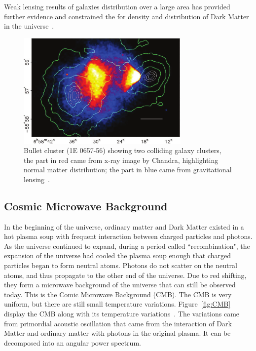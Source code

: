     Weak lensing results of galaxies distribution over a large area has provided further evidence and constrained the for density and distribution of Dark Matter in the universe~\cite{wittman2000detection}.


\begin{figure}[!htb]
    \begin{center}
        \includegraphics[width=0.75\textwidth]{figures/chapter_DM/BulletCluster}
        \caption{
			Bullet cluster (1E 0657-56) showing two colliding galaxy clusters, the part in red came from x-ray image by Chandra, highlighting normal matter distribution; the part in blue came from gravitational lensing~\cite{BulletCluster}.
        }
        \label{fig:BulletCluster_figure}
    \end{center}
\end{figure}

\subsection{Cosmic Microwave Background}
\label{sec:CMB}
In the beginning of the universe, ordinary matter and Dark Matter existed in a hot plasma soup with frequent interaction between charged particles and photons. As the universe continued to expand, during a period called ``recombination", the expansion of the universe had cooled the plasma soup enough that charged particles began to form neutral atoms. Photons do not scatter on the neutral atoms, and thus propagate to the other end of the universe. Due to red shifting, they form a microwave
background of the universe that can still be observed today. This is the Comic Microwave Background (CMB). The CMB is very uniform, but there are still small temperature variations. Figure~\ref{fig:CMB} display the CMB along with its temperature variations~\cite{fixsen2009temperature}. The variations came from primordial acoustic oscillation that came from the interaction of Dark Matter and ordinary matter with photons in the original plasma. It can be decomposed into an angular power spectrum.

